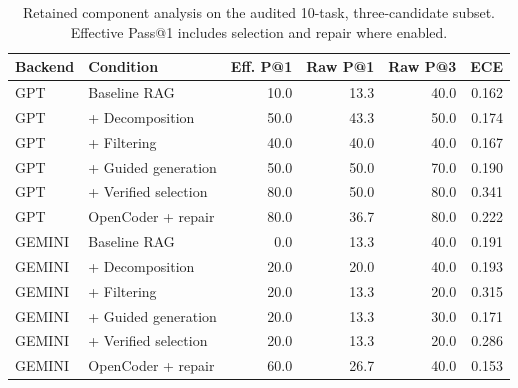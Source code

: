 \begin{table}[t]
\centering
\scriptsize
\caption{Retained component analysis on the audited 10-task, three-candidate subset. Effective Pass@1 includes selection and repair where enabled.}
\label{tab:component_ablation_final}
\begin{tabular}{llrrrr}
\toprule
Backend & Condition & Eff. P@1 & Raw P@1 & Raw P@3 & ECE \\
\midrule
GPT & Baseline RAG & 10.0 & 13.3 & 40.0 & 0.162 \\
GPT & + Decomposition & 50.0 & 43.3 & 50.0 & 0.174 \\
GPT & + Filtering & 40.0 & 40.0 & 40.0 & 0.167 \\
GPT & + Guided generation & 50.0 & 50.0 & 70.0 & 0.190 \\
GPT & + Verified selection & 80.0 & 50.0 & 80.0 & 0.341 \\
GPT & OpenCoder + repair & 80.0 & 36.7 & 80.0 & 0.222 \\
GEMINI & Baseline RAG & 0.0 & 13.3 & 40.0 & 0.191 \\
GEMINI & + Decomposition & 20.0 & 20.0 & 40.0 & 0.193 \\
GEMINI & + Filtering & 20.0 & 13.3 & 20.0 & 0.315 \\
GEMINI & + Guided generation & 20.0 & 13.3 & 30.0 & 0.171 \\
GEMINI & + Verified selection & 20.0 & 13.3 & 20.0 & 0.286 \\
GEMINI & OpenCoder + repair & 60.0 & 26.7 & 40.0 & 0.153 \\
\bottomrule
\end{tabular}
\end{table}
